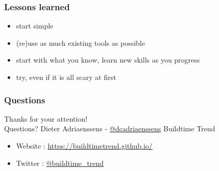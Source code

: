 \documentclass[14pt]{beamer}
\begin{document}
  \begin{frame}
    \frametitle{Lessons learned}
    \begin{itemize}
      \item start simple
      \item (re)use as much existing tools as possible
      \item start with what you know, learn new skills as you progress
      \item try, even if it is all scary at first
    \end{itemize}
  \end{frame}
  \begin{frame}
   \frametitle{Questions}
    Thanks for your attention!\\
    Questions?
    \vfill
    Dieter Adriaenssens - \href{https://twitter.com/dcadriaenssens}{@dcadriaenssens}
    \vfill
    Buildtime Trend
    \begin{itemize}
      \item Website : \href{https://buildtimetrend.github.io/}{https://buildtimetrend.github.io/}
      \item Twitter : \href{https://twitter.com/buildtime_trend}{@buildtime\_trend}
    \end{itemize}
  \end{frame}
\end{document}
